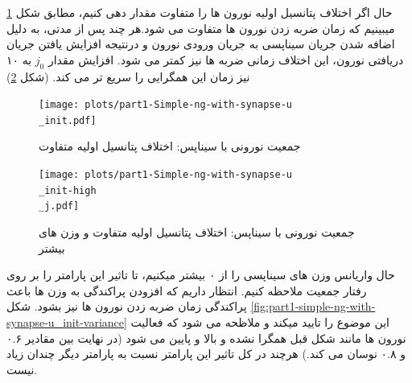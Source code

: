         حال اگر اختلاف پتانسیل اولیه نورون ها را متفاوت مقدار دهی کنیم، مطابق شکل
        \ref{fig:part1-simple-ng-with-synapse-u-init}
        میبینیم که زمان ضربه زدن نورون ها متفاوت می شود.هر چند پس از مدتی، به دلیل اضافه شدن جریان سیناپسی به جریان ورودی نورون و درنتیجه افزایش یافتن جریان دریافتی نورون، این اختلاف زمانی ضربه ها نیز کمتر می شود. افزایش مقدار 
        $j_0$ 
        به ۱۰ نیز زمان این همگرایی را سریع تر می کند.
        (شکل \ref{fig:part1-simple-ng-with-synapse-u-init-high-j})
        \begin{figure}[!ht]
            \centering
            \texttt{[image: plots/part1-Simple-ng-with-synapse-u\\\_init.pdf]} 
            \caption{جمعیت نورونی با سیناپس: اختلاف پتانسیل اولیه متفاوت}
            \label{fig:part1-simple-ng-with-synapse-u-init}
        \end{figure}
        \begin{figure}[!ht]
            \centering
            \texttt{[image: plots/part1-Simple-ng-with-synapse-u\\\_init-high\\\_j.pdf]} 
            \caption{جمعیت نورونی با سیناپس: اختلاف پتانسیل اولیه متفاوت و وزن های بیشتر}
            \label{fig:part1-simple-ng-with-synapse-u-init-high-j}
        \end{figure}

        حال واریانس وزن های سیناپسی را از ۰ بیشتر میکنیم، تا تاثیر این پارامتر را بر روی رفتار جمعیت ملاحظه کنیم. انتظار داریم که افزودن پراکندگی به وزن ها باعث پراکندگی زمان ضربه زدن نورون ها نیز بشود. شکل 
        \ref{fig:part1-simple-ng-with-synapse-u_init-variance}
        این موضوع را تایید میکند و ملاظحه می شود که فعالیت نورون ها مانند شکل قبل همگرا نشده و بالا و پایین می شود
        (در نهایت بین مقادیر ۰.۶ و ۰.۸ نوسان می کند.)
        هرچند در کل تاثیر این پارامتر نسبت به پارامتر دیگر چندان زیاد نیست.
        
